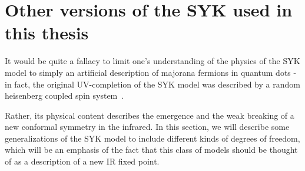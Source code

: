 \section{Other versions of the SYK used in this thesis}
It would be quite a fallacy to limit one's understanding of the physics of the SYK model to simply an artificial description of majorana fermions in quantum dots - in fact, the original UV-completion of the SYK model was described by a random heisenberg coupled spin system~\cite{sachdev1993gapless}.
\par
Rather, its physical content  describes the emergence and the weak breaking of a new conformal symmetry in the infrared. In this section, we will describe some generalizations of the SYK model to include different kinds of degrees of freedom, which will be an emphasis of the fact that this class of models should be thought of as a description of a new IR fixed point. 

